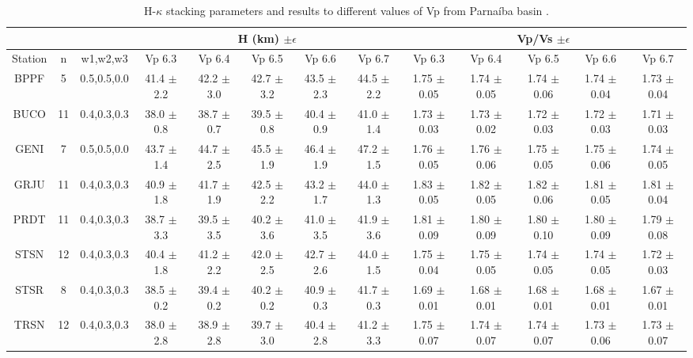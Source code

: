 \documentclass[paper,11pt]{geophysics}
\begin{document}
\begin{landscape}
\begin{table}[! htpb]
\centering

\small
	\begin{threeparttable}
\caption{H-$\kappa$ stacking parameters and results to different values of Vp from Parnaíba basin .}
\label{tabela_hk_stacking}
\begin{tabular}{ccc|ccccc|ccccc}
 &  & & \multicolumn{5}{|c|}{H (km) $\pm \epsilon$} & \multicolumn{5}{|c|}{Vp/Vs $\pm \epsilon$} \\ \hline
Station & n & w1,w2,w3 & Vp 6.3 & Vp 6.4 & Vp 6.5 & Vp 6.6 & Vp 6.7 & Vp 6.3 & Vp 6.4 & Vp 6.5 & Vp 6.6 & Vp 6.7 \\ \hline
BPPF & 5 & 0.5,0.5,0.0 & 41.4 $\pm$ 2.2 & 42.2 $\pm$ 3.0 & 42.7 $\pm$ 3.2 & 43.5 $\pm$ 2.3 & 44.5 $\pm$ 2.2 & 1.75 $\pm$ 0.05 & 1.74 $\pm$ 0.05 & 1.74 $\pm$ 0.06 & 1.74 $\pm$ 0.04 & 1.73 $\pm$ 0.04 \\
BUCO & 11 & 0.4,0.3,0.3 & 38.0 $\pm$ 0.8 & 38.7 $\pm$ 0.7 & 39.5 $\pm$ 0.8 & 40.4 $\pm$ 0.9 & 41.0 $\pm$ 1.4 & 1.73 $\pm$ 0.03 & 1.73 $\pm$ 0.02 & 1.72 $\pm$ 0.03  & 1.72 $\pm$ 0.03 & 1.71 $\pm$ 0.03\\
GENI & 7 & 0.5,0.5,0.0 & 43.7 $\pm$ 1.4 & 44.7 $\pm$ 2.5 & 45.5 $\pm$ 1.9 & 46.4 $\pm$ 1.9 & 47.2 $\pm$ 1.5 & 1.76 $\pm$ 0.05 & 1.76 $\pm$ 0.06 & 1.75 $\pm$ 0.05 & 1.75 $\pm$ 0.06 & 1.74 $\pm$ 0.05  \\
GRJU & 11 & 0.4,0.3,0.3 & 40.9 $\pm$ 1.8 & 41.7 $\pm$ 1.9 & 42.5 $\pm$ 2.2 & 43.2 $\pm$ 1.7 & 44.0 $\pm$ 1.3  & 1.83 $\pm$ 0.05 & 1.82 $\pm$ 0.05 & 1.82 $\pm$ 0.06 & 1.81 $\pm$ 0.05 & 1.81 $\pm$ 0.04 \\
PRDT & 11 & 0.4,0.3,0.3 & 38.7 $\pm$ 3.3 & 39.5 $\pm$ 3.5 & 40.2 $\pm$ 3.6 & 41.0 $\pm$ 3.5 & 41.9 $\pm$ 3.6 & 1.81 $\pm$ 0.09 & 1.80 $\pm$ 0.09 & 1.80 $\pm$ 0.10 & 1.80 $\pm$ 0.09 & 1.79 $\pm$ 0.08 \\
STSN & 12 & 0.4,0.3,0.3 & 40.4 $\pm$ 1.8 & 41.2 $\pm$ 2.2 & 42.0 $\pm$ 2.5 & 42.7 $\pm$ 2.6 & 44.0 $\pm$ 1.5  & 1.75 $\pm$ 0.04 & 1.75 $\pm$ 0.05 & 1.74 $\pm$ 0.05 & 1.74 $\pm$ 0.05 & 1.72 $\pm$ 0.03  \\
STSR & 8 & 0.4,0.3,0.3 & 38.5 $\pm$ 0.2 & 39.4 $\pm$ 0.2 & 40.2 $\pm$ 0.2 & 40.9 $\pm$ 0.3 & 41.7 $\pm$ 0.3 & 1.69 $\pm$ 0.01 & 1.68 $\pm$ 0.01 & 1.68 $\pm$ 0.01 & 1.68 $\pm$ 0.01 & 1.67 $\pm$ 0.01 \\
TRSN & 12 & 0.4,0.3,0.3 & 38.0 $\pm$ 2.8 & 38.9 $\pm$ 2.8 & 39.7 $\pm$ 3.0 & 40.4 $\pm$ 2.8 & 41.2 $\pm$ 3.3  & 1.75 $\pm$ 0.07 & 1.74 $\pm$ 0.07 & 1.74 $\pm$ 0.07 & 1.73 $\pm$ 0.06 & 1.73 $\pm$ 0.07 \\

\end{tabular}
\end{threeparttable}
\end{table}
\end{landscape}
\end{document}
